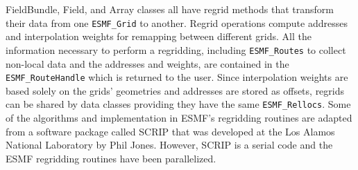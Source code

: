 %


FieldBundle, Field, and Array classes all have regrid methods that transform their
data from one {\tt ESMF\_Grid} to another.  Regrid operations compute addresses
and interpolation weights for remapping between different grids.  All
the information necessary to perform a regridding, including {\tt ESMF\_Routes}
to collect non-local data and the addresses and weights, are contained in the
{\tt ESMF\_RouteHandle} which is returned to the user.  Since interpolation
weights are based solely on the grids' geometries and addresses are stored
as offsets, regrids can be shared by data classes providing
they have the same {\tt ESMF\_Rellocs}.  Some of the algorithms and 
implementation in ESMF's regridding routines are adapted from a software package
called SCRIP that was developed at the Los Alamos National Laboratory by Phil
Jones.  However, SCRIP is a serial code and the ESMF regridding routines have
been parallelized.


